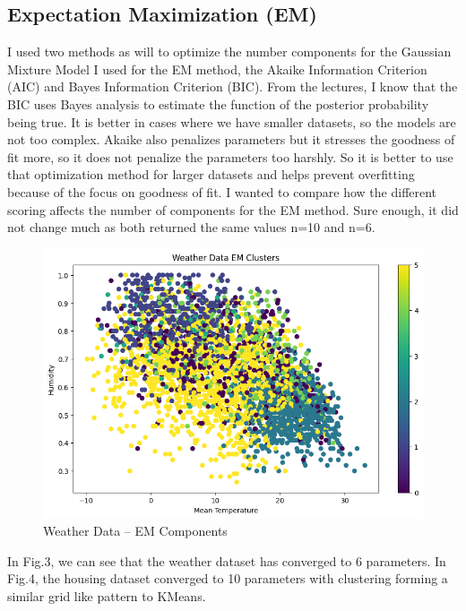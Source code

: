 \documentclass[conference]{IEEEtran}
\begin{document}
\subsection{Expectation Maximization (EM)}
\par I used two methods as will to optimize the number components for the Gaussian Mixture Model I used for the EM method, the Akaike Information Criterion (AIC) and Bayes Information Criterion (BIC). From the lectures, I know that the BIC uses Bayes analysis to estimate the function of the posterior probability being true. It is better in cases where we have smaller datasets, so the models are not too complex. Akaike also penalizes parameters but it stresses the goodness of fit more, so it does not penalize the parameters too harshly. So it is better to use that optimization method for larger datasets and helps prevent overfitting because of the focus on goodness of fit. I wanted to compare how the different scoring affects the number of components for the EM method. Sure enough, it did not change much as both returned the same values n=10 and n=6.
\begin{figure}
    \centering
    \includegraphics[width=1.0\linewidth]{figures//weather_figures/step_1b.png}
    \caption{Weather Data -- EM Components}
    \label{fig:3_weather_EM
}
\end{figure}
In Fig.3, we can see that the weather dataset has converged to 6 parameters. In Fig.4, the housing dataset converged to 10 parameters with clustering forming a similar grid like pattern to KMeans. 
\end{document}
